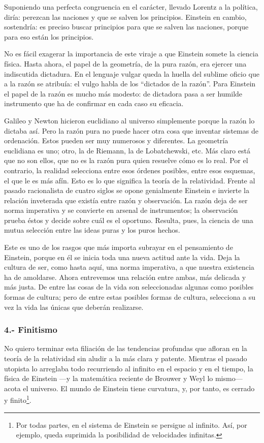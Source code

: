 \documentclass[a4paper, 12pt]{article}
\begin{document}
Suponiendo una perfecta congruencia en el carácter, llevado Lorentz a la
política, diría: perezcan las naciones y que se salven los principios.
Einstein en cambio, sostendría: es preciso buscar principios para que se
salven las naciones, porque para eso están los principios.

No es fácil exagerar la importancia de este viraje a que Einstein somete
la ciencia física. Hasta ahora, el papel de la geometría, de la pura
razón, era ejercer una indiscutida dictadura. En el lenguaje vulgar queda
la huella del sublime oficio que a la razón se atribuía: el vulgo habla de
los  ``dictados de la razón''. Para Einstein el papel de la razón es mucho
más modesto: de dictadora pasa a ser humilde instrumento que ha de
confirmar en cada caso su eficacia.

Galileo y Newton hicieron euclidiano al universo simplemente porque la
razón lo dictaba así. Pero la razón pura no puede hacer otra cosa que
inventar sistemas de ordenación. Estos pueden ser muy numerosos y
diferentes. La geometría euclidiana es uno; otro, la de Riemann, la de
Lobatchewski, etc. Más claro está que no son ellos, que no es la razón
pura quien resuelve cómo es lo real. Por el contrario, la realidad
selecciona entre esos órdenes posibles, entre esos esquemas, el que le es
más afín. Esto es lo que significa la teoría de la relatividad. Frente al
pasado racionalista de cuatro siglos se opone genialmente Einstein e
invierte la relación inveterada que existía entre razón y observación. La
razón deja de ser norma imperativa y se convierte en arsenal de
instrumentos; la observación prueba éstos y decide sobre cuál es el
oportuno. Resulta, pues, la ciencia de una mutua selección entre las ideas
puras y los puros hechos.

Este es uno de los rasgos que más importa subrayar en el pensamiento de
Einstein, porque en él se inicia toda una nueva actitud ante la vida. Deja
la cultura de ser, como hasta aquí, una norma imperativa, a que nuestra
existencia ha de amoldarse. Ahora entrevemos una relación entre ambas, más
delicada y más justa. De entre las cosas de la vida son seleccionadas
algunas como posibles formas de cultura; pero de entre estas posibles
formas de cultura, selecciona a su vez la vida las únicas que deberán
realizarse.

\subsubsection*{4.- Finitismo}

No quiero terminar esta filiación de las tendencias profundas que afloran
en la teoría de la relatividad sin aludir a la más clara y patente.
Mientras el pasado utopista lo arreglaba todo recurriendo al infinito en
el espacio y en el tiempo, la física de Einstein ---y la matemática reciente
de Brouwer y Weyl lo mismo--- acota el universo. El mundo de Einstein tiene
curvatura, y, por tanto, es cerrado y finito\footnote{Por todas partes, en el sistema de Einstein se persigue al infinito.
Así, por ejemplo, queda suprimida la posibilidad de velocidades infinitas.}.
\end{document}
